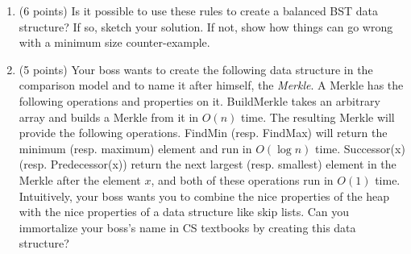 \documentclass[11pt]{article}
\begin{document}
\begin{enumerate}
\begin{enumerate}
\end{enumerate}

 
 
 \begin{enumerate}
 
Your colleague wants to change the rules of red-black trees to the following:
 \begin{itemize}
\item The root node and leaf nodes (NIL) can be either red or black
\item If a node is red and not a leaf node, both of its children are black
\item If a node is black and not a leaf node, both of its children are black
\item For each node, all paths from the node to descendant leaves contain the same number of black nodes
\end{itemize}
\item (6 points) Is it possible to use these rules to create a balanced BST data structure?  If so, sketch your solution.  If not, show how things can go wrong with a minimum size counter-example.
 
 \pagebreak

\item (5 points) Your boss wants to create the following data structure in the comparison model and to name it after himself, the \emph{Merkle}.  A Merkle has the following operations and properties on it.  BuildMerkle takes an arbitrary array and builds a Merkle from it in $O(n)$ time.  The resulting Merkle will provide the following operations.  FindMin (resp. FindMax) will return the minimum (resp. maximum) element and run in $O(\log n)$ time.  Successor(x) (resp. Predecessor(x)) return the next largest (resp. smallest) element in the Merkle after the element $x$, and both of these operations run in $O(1)$ time.  Intuitively, your boss wants you to combine the nice properties of the heap with the nice properties of a data structure like skip lists.  Can you immortalize your boss's name in CS textbooks by creating this data structure?


\pagebreak


\end{enumerate}
\end{enumerate}
\end{document}
